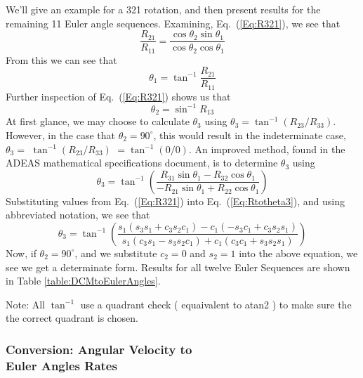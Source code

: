 We'll give an example for a 321 rotation, and then present results
for the remaining 11 Euler angle sequences.  Examining,
Eq.~(\ref{Eq:R321}), we see that
%
\begin{equation}
     \frac{ R_{21} }  { R_{11}  } = \frac{  \cos{\theta_2}\sin{\theta_1}     }
                                 {  \cos{\theta_2}\cos{\theta_1}    }
\end{equation}
%
From this we can see that
%
\begin{equation}
    \theta_1 =  \tan^{-1}{\frac{ R_{21} }  { R_{11}  }}
\end{equation}
%
Further inspection of Eq.~(\ref{Eq:R321}) shows us that
%
\begin{equation}
    \theta_2 = \sin^{-1}{R_{13}}
\end{equation}
%
At first glance, we may choose to calculate $\theta_3$ using
$\theta_3 = \tan^{-1}{(R_{23}/R_{33})}$.  However, in the case that
$\theta_2 = 90^\circ$, this would result in the indeterminate case,
$\theta_3 =$ $\tan^{-1}(R_{23}/R_{33})$ $= \tan^{-1}(0/0)$.  An
improved method, found in the ADEAS mathematical specifications
document, is to determine $\theta_3$ using
%
\begin{equation}
    \theta_3 = \tan^{-1} \left(\frac{ R_{31} \sin{\theta_1} - R_{32} \cos{\theta_1} }
    { -R_{21} \sin{\theta_1} + R_{22} \cos{\theta_1}} \right)
    \label{Eq:Rtotheta3}
\end{equation}
%
Substituting values from Eq.~(\ref{Eq:R321}) into
Eq.~(\ref{Eq:Rtotheta3}), and using abbreviated notation, we see
that
%
\begin{equation}
     \theta_3 = \tan^{-1} \left(  \frac{ s_1( s_3s_1 + c_3s_2c_1) - c_1(-s_3c_1 + c_3s_2s_1 )}
    { s_1(c_3s_1 - s_3s_2c_1  ) + c_1( c_3c_1 + s_3s_2s_1 ) }  \right)
\end{equation}
%
Now, if $\theta_2 = 90^\circ$, and we substitute $c_2 = 0$ and $s_2
= 1$ into the above equation, we see we get a determinate form.
Results for all twelve Euler Sequences are shown in Table
\ref{table:DCMtoEulerAngles}.

\noindent Note:  All $\tan^{-1}$ use a quadrant check ( equaivalent
to atan2 ) to make sure the the correct quadrant is chosen.

\subsubsection{Conversion:  Angular Velocity to \\ Euler Angles
Rates}

